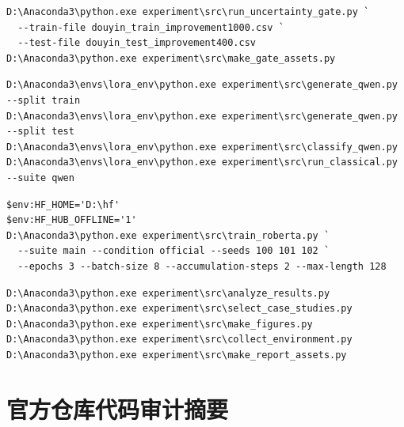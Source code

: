 \documentclass[UTF8,zihao=-4,a4paper]{ctexart}
\begin{document}
\begin{lstlisting}[language={},caption={验证集不确定性门控（Qwen 二次意见）}]
D:\Anaconda3\python.exe experiment\src\run_uncertainty_gate.py `
  --train-file douyin_train_improvement1000.csv `
  --test-file douyin_test_improvement400.csv
D:\Anaconda3\python.exe experiment\src\make_gate_assets.py
\end{lstlisting}

\begin{lstlisting}[language={},caption={Qwen 解释、直接分类与 400 条消融}]
D:\Anaconda3\envs\lora_env\python.exe experiment\src\generate_qwen.py --split train
D:\Anaconda3\envs\lora_env\python.exe experiment\src\generate_qwen.py --split test
D:\Anaconda3\envs\lora_env\python.exe experiment\src\classify_qwen.py
D:\Anaconda3\envs\lora_env\python.exe experiment\src\run_classical.py --suite qwen
\end{lstlisting}

\begin{lstlisting}[language={},caption={RoBERTa 三随机种子示例}]
$env:HF_HOME='D:\hf'
$env:HF_HUB_OFFLINE='1'
D:\Anaconda3\python.exe experiment\src\train_roberta.py `
  --suite main --condition official --seeds 100 101 102 `
  --epochs 3 --batch-size 8 --accumulation-steps 2 --max-length 128
\end{lstlisting}

\begin{lstlisting}[language={},caption={汇总、选例、出图与环境快照}]
D:\Anaconda3\python.exe experiment\src\analyze_results.py
D:\Anaconda3\python.exe experiment\src\select_case_studies.py
D:\Anaconda3\python.exe experiment\src\make_figures.py
D:\Anaconda3\python.exe experiment\src\collect_environment.py
D:\Anaconda3\python.exe experiment\src\make_report_assets.py
\end{lstlisting}

\section{官方仓库代码审计摘要}
\end{document}
